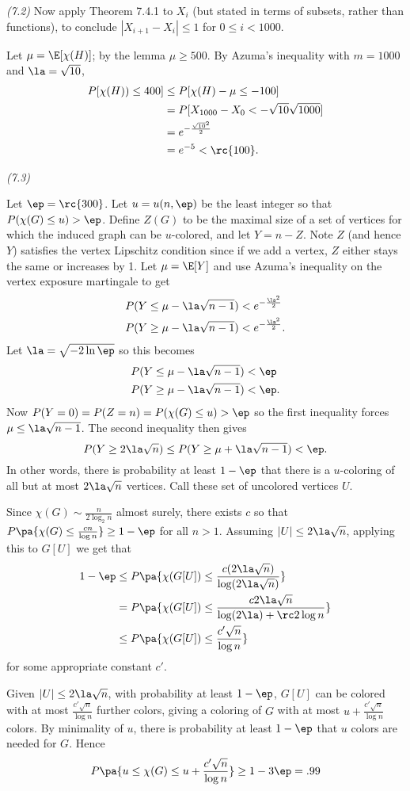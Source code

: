 \begin{problem} {\it (7.2)}
Now apply Theorem 7.4.1 to $X_i$ (but stated in terms of subsets, rather than functions), to conclude $|X_{i+1}-X_i|\le 1$ for $0\le i<1000$. 

Let $\mu=\E[\chi(H)]$; by the lemma $\mu\ge 500$.
By Azuma's inequality with $m=1000$ and $\la=\sqrt{10}$,
\begin{align*}
P[\chi(H))\le 400]&\le P[\chi(H)-\mu\le -100]\\
&=P[X_{1000}-X_0<-\sqrt{10}\sqrt{1000}]\\
&=e^{-\frac{\sqrt{10}^2}{2}}\\
&=e^{-5}<\rc{100}.
\end{align*}
\end{problem}
\begin{problem} {\it (7.3)}

Let $\ep=\rc{300}$. Let $u=u(n,\ep)$ be the least integer so that $P(\chi(G)\le u)>\ep$. Define $Z(G)$ to be the maximal size of a set of vertices for which the induced graph can be $u$-colored, and let $Y=n-Z$. Note $Z$ (and hence $Y$) satisfies the vertex Lipschitz condition since if we add a vertex, $Z$ either stays the same or increases by 1. Let $\mu=\E[Y]$ and use Azuma's inequality on the vertex exposure martingale to get
\begin{align*}
P(Y\le \mu-\la\sqrt{n-1})&<e^{-\frac{\la^2}2}\\
P(Y\ge \mu-\la\sqrt{n-1})&<e^{-\frac{\la^2}2}.
\end{align*}
Let $\la=\sqrt{-2\ln \ep}$ so this becomes
\begin{align*}
P(Y\le \mu-\la\sqrt{n-1})&<\ep\\
P(Y\ge \mu-\la\sqrt{n-1})&<\ep.
\end{align*}
Now $P(Y=0)=P(Z=n)=P(\chi(G)\le u)>\ep$ so the first inequality forces $\mu\le \la\sqrt{n-1}$. The second inequality then gives
\[
P(Y\ge 2\la\sqrt{n})\le P(Y\ge \mu+\la\sqrt{n-1})< \ep.
\]
In other words, there is probability at least $1-\ep$ that there is a $u$-coloring of all but at most $2\la\sqrt n$ vertices. Call these set of uncolored vertices $U$.

Since $\chi(G)\sim \frac{n}{2\log_2 n}$ almost surely, there exists $c$ so that $P\pa{\chi(G)\le \frac{cn}{\log n}}\ge 1-\ep$ for all $n>1$. Assuming $|U|\le 2\la \sqrt n$, applying this to $G[U]$ we get that
\begin{align*}
1-\ep&\le 
P\pa{\chi(G[U])\le \frac{c(2\la\sqrt n)}{\log(2\la\sqrt n)}}\\
&=P\pa{\chi(G[U])\le \frac{c2\la\sqrt n}{\log (2\la)+\rc 2\log{ n}}}\\
&\le P\pa{\chi(G[U])\le \frac{c' \sqrt n}{\log n}}
\end{align*}
for some appropriate constant $c'$.

Given $|U|\le 2\la \sqrt n$, with probability at least $1-\ep$, $G[U]$ can be colored with at most $\frac{c'\sqrt n}{\log n}$ further colors, giving a coloring of $G$ with at most $u+\frac{c'\sqrt n}{\log n}$ colors. By minimality of $u$, there is probability at least $1-\ep$ that $u$ colors are needed for $G$. Hence
\[
P\pa{u\le \chi(G)\le u+\frac{c'\sqrt n}{\log n}}\ge 1-3\ep=.99
\]
\end{problem}

